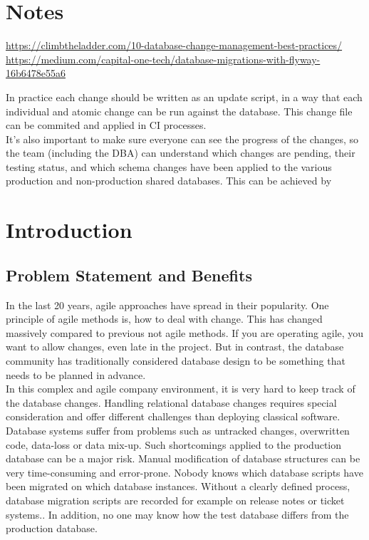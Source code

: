 


\chapter{Notes}


\url{https://climbtheladder.com/10-database-change-management-best-practices/}
\url{https://medium.com/capital-one-tech/database-migrations-with-flyway-16b6478e55a6}


In practice each change should be written as an update script, in a way that each individual and atomic change can be run against the database. This change file can be commited and applied in CI processes.\\

It's also important to make sure everyone can see the progress of the changes, so the team (including the DBA) can understand which changes are pending, their testing status, and which schema changes have been applied to the various production and non-production shared databases. This can be achieved by\\

\chapter{Introduction}


\section{Problem Statement and Benefits}%
 
 In the last 20 years, agile approaches have spread in their popularity. One principle of agile methods is, how to deal with change. This has changed massively compared to previous not agile methods. If you are operating agile, you want to allow changes, even late in the project. But in contrast, the database community has traditionally considered database design to be something that needs to be planned in advance.\\
 
 In this complex and agile company environment, it is very hard to keep track of the database changes. Handling relational database changes requires special consideration and offer different challenges than deploying classical software. Database systems suffer from problems such as untracked changes, overwritten code, data-loss or data mix-up. Such shortcomings applied to the production database can be a major risk. Manual modification of database structures can be very time-consuming and error-prone. Nobody knows which database scripts have been migrated on which database instances. 
 Without a clearly defined process, database migration scripts are recorded for example on release notes or ticket systems..
In addition, no one may know how the test database differs from the production database.\\
 
